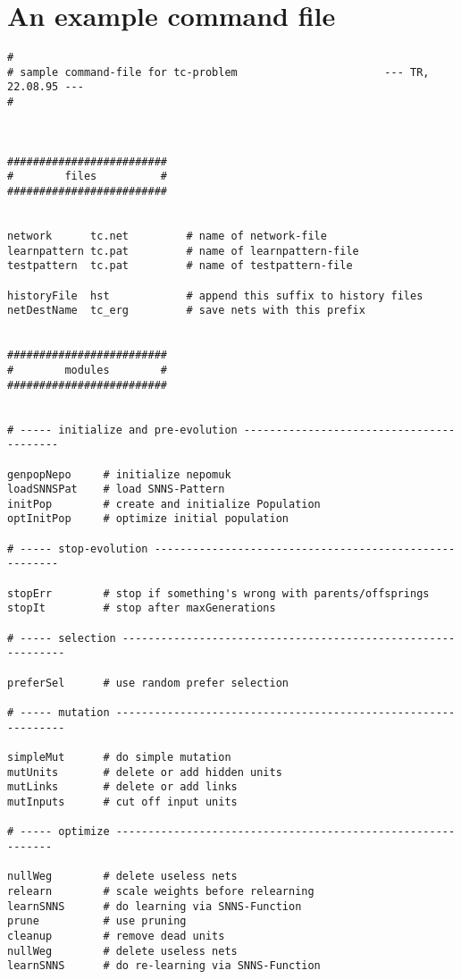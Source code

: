 

\section{An example command file \label{bspcmd}}
{
\small

\begin{verbatim}
#
# sample command-file for tc-problem                       --- TR, 22.08.95 ---
# 



#########################
#        files          #
#########################


network      tc.net         # name of network-file
learnpattern tc.pat         # name of learnpattern-file
testpattern  tc.pat         # name of testpattern-file

historyFile  hst            # append this suffix to history files
netDestName  tc_erg         # save nets with this prefix


#########################
#        modules        #
#########################


# ----- initialize and pre-evolution -----------------------------------------

genpopNepo     # initialize nepomuk
loadSNNSPat    # load SNNS-Pattern
initPop        # create and initialize Population
optInitPop     # optimize initial population

# ----- stop-evolution -------------------------------------------------------

stopErr        # stop if something's wrong with parents/offsprings
stopIt         # stop after maxGenerations 

# ----- selection -------------------------------------------------------------

preferSel      # use random prefer selection

# ----- mutation --------------------------------------------------------------

simpleMut      # do simple mutation
mutUnits       # delete or add hidden units
mutLinks       # delete or add links
mutInputs      # cut off input units

# ----- optimize ------------------------------------------------------------

nullWeg        # delete useless nets
relearn        # scale weights before relearning
learnSNNS      # do learning via SNNS-Function
prune          # use pruning 
cleanup        # remove dead units
nullWeg        # delete useless nets 
learnSNNS      # do re-learning via SNNS-Function


\end{verbatim}}

